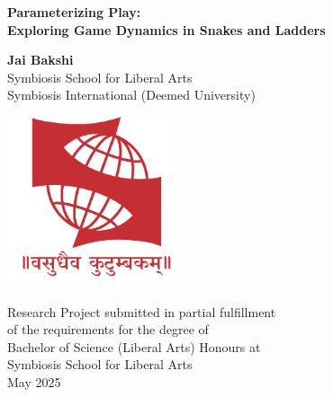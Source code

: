 \begin{titlepage}
	\begin{center}
		\vspace*{2cm}
		
		\Large
		\textbf{Parameterizing Play:\\ Exploring Game Dynamics in Snakes and Ladders}
		
		\vspace{0.5cm}
		
		\vspace{1.5cm}
		
		\textbf{Jai Bakshi}\\
		\vspace{0.2cm}
		Symbiosis School for Liberal Arts\\
		\vspace{0.2cm}
		Symbiosis International (Deemed University)
		
		\vfill
		
		\includegraphics[width=5cm]{SIU_Logo.png}
		
		\vfill
		
		\Large
		Research Project submitted in partial fulfillment\\
		\vspace{0.2cm}
		of the requirements for the degree of\\
		\vspace{0.2cm}
		Bachelor of Science (Liberal Arts) Honours at\\ 
		\vspace{0.2cm}
		Symbiosis School for Liberal Arts\\
		\vspace{0.2cm}
		May 2025
		\vspace{2cm}
	\end{center}
\end{titlepage}